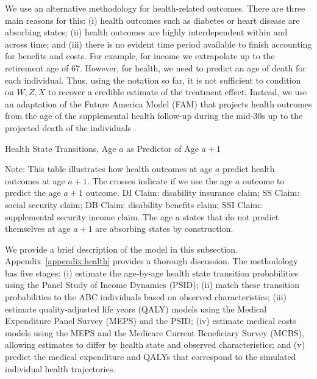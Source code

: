 \noindent We use an alternative methodology for health-related outcomes. There are three main reasons for this: (i) health outcomes such as diabetes or heart disease are absorbing states; (ii) health outcomes are highly interdependent within and across time; and (iii) there is no evident time period available to finish accounting for benefits and costs. For example, for income we extrapolate up to the retirement age of 67. However, for health, we need to predict an age of death for each individual. Thus, using the notation so far, it is not sufficient to condition on $W, Z, X$ to recover a credible estimate of the treatment effect. Instead, we use an adaptation of the Future America Model (FAM) that projects health outcomes from the age of the supplemental health follow-up during the mid-30s up to the projected death of the individuals \citep{Goldman_etal_2015_Future-Elderly-Model-Report}. \\

\begin{table}
\begin{threeparttable}
\caption{Health State Transitions, Age $a$ as Predictor of Age $a+1$}\label{table:transition}
\scriptsize

\begin{tablenotes}
\footnotesize
\item Note: This table illustrates how health outcomes at age $a$ predict health outcomes at age $a+1$. The crosses indicate if we use the age $a$ outcome to predict the age $a+1$ outcome. DI Claim: disability insurance claim; SS Claim: social security claim; DB Claim: disability benefits claim; SSI Claim: supplemental security income claim. The age $a$ states that do not predict themselves at age $a+1$ are absorbing states by construction.
\end{tablenotes}
\end{threeparttable}
\end{table}

\noindent We provide a brief description of the model in this subsection. Appendix~\ref{appendix:health} provides a thorough discussion. The methodology has five stages: (i) estimate the age-by-age health state transition probabilities using the Panel Study of Income Dynamics (PSID); (ii) match these transition probabilities to the ABC individuals based on observed characteristics; (iii) estimate quality-adjusted life years (QALY) models using the Medical Expenditure Panel Survey (MEPS) and the PSID; (iv) estimate medical costs models using the MEPS and the Medicare Current Beneficiary Survey (MCBS), allowing estimates to differ by health state and observed characteristics; and (v) predict the medical expenditure and QALYs that correspond to the simulated individual health trajectories. \\

